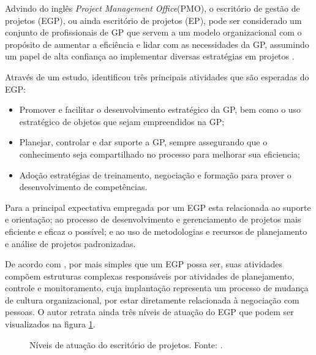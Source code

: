 Advindo do inglês \textit{Project Management Office}(PMO), o escritório de gestão de projetos (EGP), ou ainda escritório de projetos (EP), pode ser considerado um conjunto de profissionais de GP que servem a um modelo organizacional com o propósito de aumentar a eficiência e lidar com as necessidades da GP, assumindo um papel de alta confiança ao implementar diversas estratégias em projetos \cite{kendall2003advanced}.

Através de um estudo,  identificou três principais atividades que são esperadas do EGP:

\begin{itemize}
  \item Promover e facilitar o desenvolvimento estratégico da GP, bem como o uso estratégico de objetos que sejam empreendidos na GP;
  \item Planejar, controlar e dar suporte a GP, sempre assegurando que o conhecimento seja compartilhado no processo para melhorar sua eficiencia;
  \item Adoção estratégias de treinamento, negociação e formação para prover o desenvolvimento de competências.
\end{itemize}

Para  a principal expectativa empregada por um EGP esta relacionada ao suporte e orientação; ao processo de desenvolvimento e gerenciamento de projetos mais eficiente e eficaz o possível; e ao uso de metodologias e recursos de planejamento e análise de projetos padronizadas.

De acordo com , por mais simples que um EGP possa ser, suas atividades compõem estruturas complexas responsáveis por atividades de planejamento, controle e monitoramento, cuja implantação representa um processo de mudança de cultura organizacional, por estar diretamente relacionada à negociação com pessoas. O autor retrata ainda três níveis de atuação do EGP que podem ser visualizados na figura \ref{pmo_crawford}.


\begin{figure}[ht]
  \centering
  \caption{Níveis de atuação do escritório de projetos. Fonte: \cite{crawford2010strategic}.}
  \label{pmo_crawford}
\end{figure}

